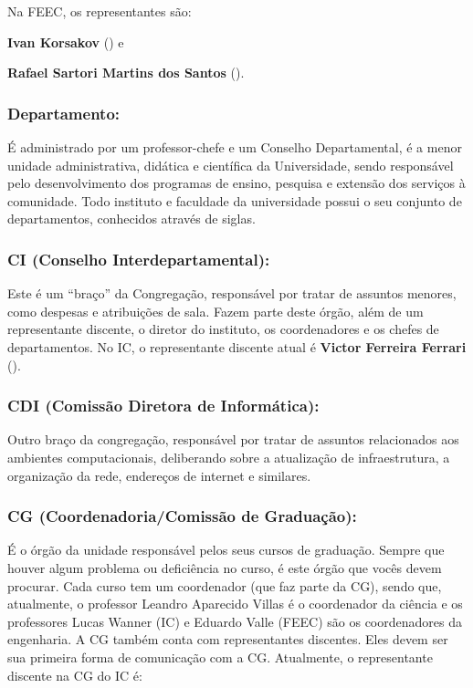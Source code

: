 Na FEEC, os representantes são:

\begin{compactitemize}
\item \textbf{Ivan Korsakov} () e
\item \textbf{Rafael Sartori Martins dos Santos} 
().
\end{compactitemize}

\subsubsection{Departamento:} É administrado por um professor-chefe e um
Conselho Departamental, é a menor unidade administrativa, didática e científica
da Universidade, sendo responsável pelo desenvolvimento dos programas de
ensino, pesquisa e extensão dos serviços à comunidade. Todo instituto e
faculdade da universidade possui o seu conjunto de departamentos, conhecidos
através de siglas.

\subsubsection{CI (Conselho Interdepartamental):} Este é um ``braço'' da
Congregação, responsável por tratar de assuntos menores, como despesas e
atribuições de sala. Fazem parte deste órgão, além de um representante
discente, o diretor do instituto, os coordenadores e os chefes de
departamentos. No IC, o representante discente atual é \textbf{Victor Ferreira
Ferrari} ().

\subsubsection{CDI (Comissão Diretora de Informática):} Outro braço da
congregação, responsável por tratar de assuntos relacionados aos ambientes
computacionais, deliberando sobre a atualização de infraestrutura, a
organização da rede, endereços de internet e similares.

\subsubsection{CG (Coordenadoria/Comissão de Graduação):} É o órgão da unidade
responsável pelos seus cursos de graduação. Sempre que houver algum problema ou
deficiência no curso, é este órgão que vocês devem procurar.  Cada curso tem um
coordenador (que faz parte da CG), sendo que, atualmente, o professor Leandro
Aparecido Villas é o coordenador da ciência e os professores Lucas Wanner (IC)
e Eduardo Valle (FEEC) são os coordenadores da engenharia. A CG também conta
com representantes discentes. Eles devem ser sua primeira forma de comunicação
com a CG.  Atualmente, o representante discente na CG do IC é:

